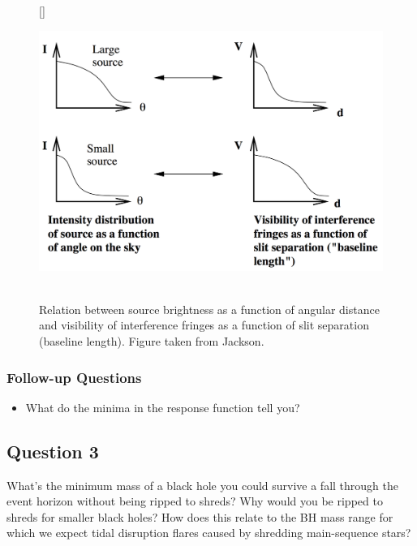 \documentclass[a4paper,10pt]{article}
\begin{document}
\begin{figure}[t]
    [\FBwidth]
    {\caption{\footnotesize{\\Relation between source brightness as a function of angular distance and visibility of interference fringes as a function of slit separation (baseline length). Figure taken from Jackson.}}
    \label{fig:fringevisibility}}
    {\includegraphics[width=12cm]{figures/FringeVisibility.png}}
\end{figure}

\subsubsection{Follow-up Questions}

\begin{itemize}
    \item What do the minima in the response function tell you?
\end{itemize}


\newpage
\subsection{Question 3}

What's the minimum mass of a black hole you could survive a fall through the event horizon without being ripped to shreds? Why would you be ripped to shreds for smaller black holes? How does this relate to the BH mass range for which we expect tidal disruption flares caused by shredding main-sequence stars?
\end{document}
